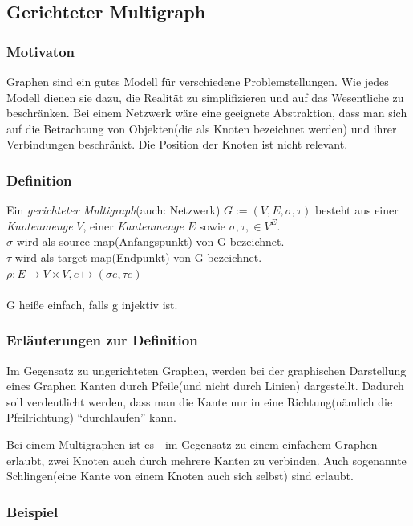 \subsection{Gerichteter Multigraph}
\subsubsection{Motivaton}
Graphen sind ein gutes Modell für verschiedene Problemstellungen.
Wie jedes Modell dienen sie dazu, die Realität zu simplifizieren und auf das Wesentliche zu beschränken.
Bei einem Netzwerk wäre eine geeignete Abstraktion, dass man sich auf die Betrachtung von Objekten(die als Knoten bezeichnet werden) und ihrer Verbindungen beschränkt.
Die Position der Knoten ist nicht relevant.


\subsubsection{Definition}
Ein \emph{gerichteter Multigraph}(auch: Netzwerk) $G:= (V,E,\sigma,\tau) $ besteht aus einer \emph{Knotenmenge} $V$, einer \emph{Kantenmenge} $E$ sowie
$\sigma , \tau , \in V^E $.
\\ $\sigma $ wird als source map(Anfangspunkt) von G bezeichnet.
\\ $\tau $ wird als target map(Endpunkt) von G bezeichnet.
\\ $\rho : E \rightarrow V \times V, e \mapsto (\sigma e, \tau e) $
\\
\\G heiße einfach, falls g injektiv ist.

\subsubsection{Erläuterungen zur Definition}
Im Gegensatz zu ungerichteten Graphen, werden bei der graphischen Darstellung eines Graphen Kanten durch Pfeile(und nicht durch Linien) dargestellt.
Dadurch soll verdeutlicht werden, dass man die Kante nur in eine Richtung(nämlich die Pfeilrichtung) ``durchlaufen'' kann.

Bei einem Multigraphen ist es - im Gegensatz zu einem einfachem Graphen - erlaubt, zwei Knoten auch durch mehrere Kanten zu verbinden.
Auch sogenannte Schlingen(eine Kante von einem Knoten auch sich selbst) sind erlaubt.

\subsubsection{Beispiel}
